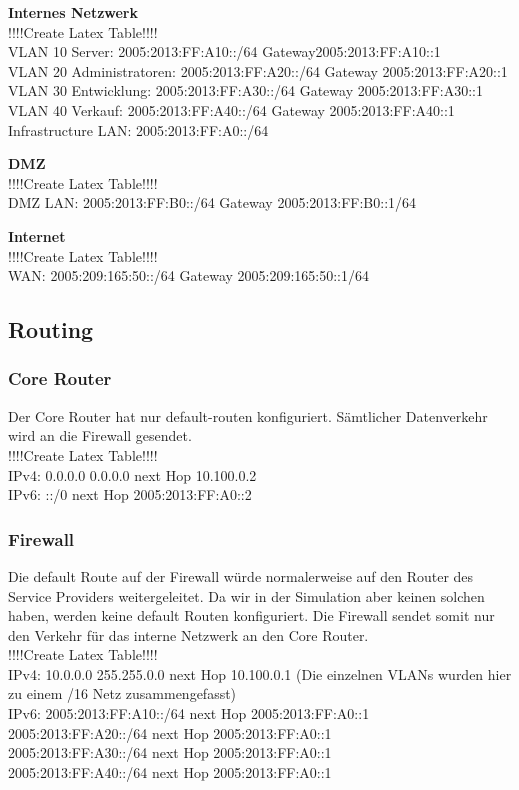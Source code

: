 \documentclass[11pt,a4paper,parskip=half]{scrartcl}
\begin{document}
\textbf{Internes Netzwerk}\\
!!!!Create Latex Table!!!!\\
VLAN 10 Server: 2005:2013:FF:A10::/64 Gateway2005:2013:FF:A10::1\\
VLAN 20 Administratoren: 2005:2013:FF:A20::/64 Gateway 2005:2013:FF:A20::1\\
VLAN 30 Entwicklung: 2005:2013:FF:A30::/64 Gateway 2005:2013:FF:A30::1\\
VLAN 40 Verkauf: 2005:2013:FF:A40::/64 Gateway 2005:2013:FF:A40::1\\
Infrastructure LAN: 2005:2013:FF:A0::/64

\textbf{DMZ}\\
!!!!Create Latex Table!!!!\\
DMZ LAN: 2005:2013:FF:B0::/64 Gateway 2005:2013:FF:B0::1/64

\textbf{Internet}\\
!!!!Create Latex Table!!!!\\
WAN: 2005:209:165:50::/64 Gateway 2005:209:165:50::1/64

\subsection{Routing}
\subsubsection{Core Router}
Der Core Router hat nur default-routen konfiguriert. Sämtlicher Datenverkehr wird an die Firewall gesendet.\\
!!!!Create Latex Table!!!!\\
IPv4: 0.0.0.0 0.0.0.0 next Hop 10.100.0.2\\
IPv6: ::/0 next Hop 2005:2013:FF:A0::2

\subsubsection{Firewall}
Die default Route auf der Firewall würde normalerweise auf den Router des Service Providers weitergeleitet. Da wir in der Simulation aber keinen solchen haben, werden keine default Routen konfiguriert. Die Firewall sendet somit nur den Verkehr für das interne Netzwerk an den Core Router.\\
!!!!Create Latex Table!!!!\\
IPv4: 10.0.0.0 255.255.0.0 next Hop 10.100.0.1 (Die einzelnen VLANs wurden hier zu einem /16 Netz zusammengefasst)\\
IPv6: 2005:2013:FF:A10::/64 next Hop 2005:2013:FF:A0::1\\
2005:2013:FF:A20::/64 next Hop 2005:2013:FF:A0::1\\
2005:2013:FF:A30::/64 next Hop 2005:2013:FF:A0::1\\
2005:2013:FF:A40::/64 next Hop 2005:2013:FF:A0::1
\end{document}
